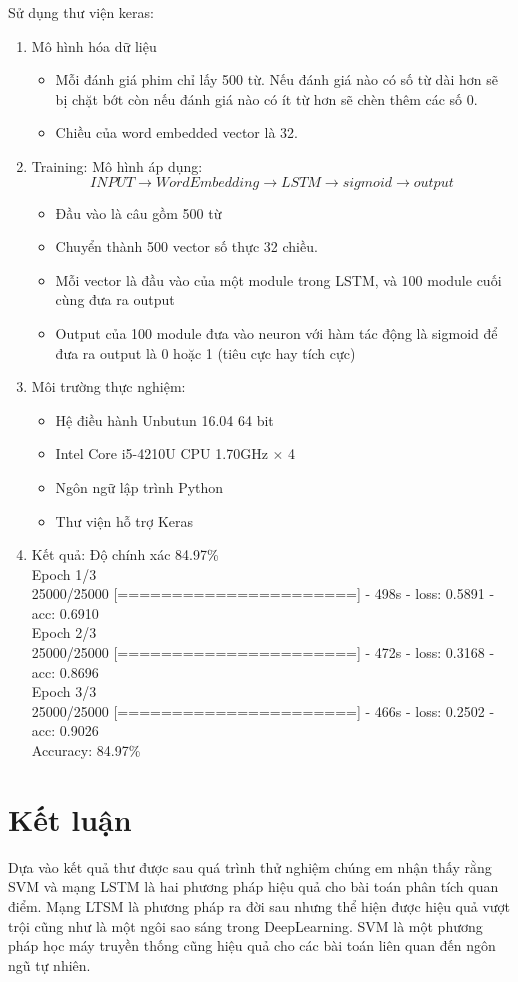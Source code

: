 \documentclass[a4paper,12pt]{report}
\begin{document}
Sử dụng thư viện keras:
\begin{enumerate}
\item Mô hình hóa dữ liệu
\begin{itemize}
\item Mỗi đánh giá phim chỉ lấy 500 từ. Nếu đánh giá nào có số từ dài hơn sẽ bị chặt bớt còn nếu đánh giá nào có ít từ hơn sẽ chèn thêm các số 0.
\item Chiều của word embedded vector là 32.
\end{itemize}
\item Training: Mô hình áp dụng:
$$ INPUT \rightarrow WordEmbedding \rightarrow LSTM \rightarrow sigmoid \rightarrow output$$
\begin{itemize}
\item Đầu vào là câu gồm 500 từ
\item Chuyển thành 500 vector số thực 32 chiều.
\item Mỗi vector là đầu vào của một module trong LSTM, và 100 module cuối cùng đưa ra output 
\item Output của 100 module đưa vào neuron với hàm tác động là sigmoid để đưa ra output là 0 hoặc 1 (tiêu cực hay tích cực)
\end{itemize}
\item Môi trường thực nghiệm:
\begin{itemize}
\item Hệ điều hành Unbutun 16.04 64 bit
\item Intel Core i5-4210U CPU 1.70GHz $\times$ 4
\item Ngôn ngữ lập trình Python
\item Thư viện hỗ trợ Keras
\end{itemize}
\item Kết quả: Độ chính xác 84.97\%
\\[0.5cm]{\small
Epoch 1/3\\
25000/25000 [======================] - 498s - loss: 0.5891 - acc: 0.6910\\
Epoch 2/3\\
25000/25000 [======================] - 472s - loss: 0.3168 - acc: 0.8696\\   
Epoch 3/3\\
25000/25000 [======================] - 466s - loss: 0.2502 - acc: 0.9026\\
Accuracy: 84.97\% \\
}
\end{enumerate}

\chapter{Kết luận}
Dựa vào kết quả thư được sau quá trình thử nghiệm chúng em nhận thấy rằng SVM và mạng LSTM là hai phương pháp hiệu quả cho bài toán phân tích quan điểm. Mạng LTSM là phương pháp ra đời sau nhưng thể hiện được hiệu quả vượt trội cũng như là một ngôi sao sáng trong DeepLearning. SVM là một phương pháp học máy truyền thống cũng hiệu quả cho các bài toán liên quan đến ngôn ngũ tự nhiên. 
\end{document}
